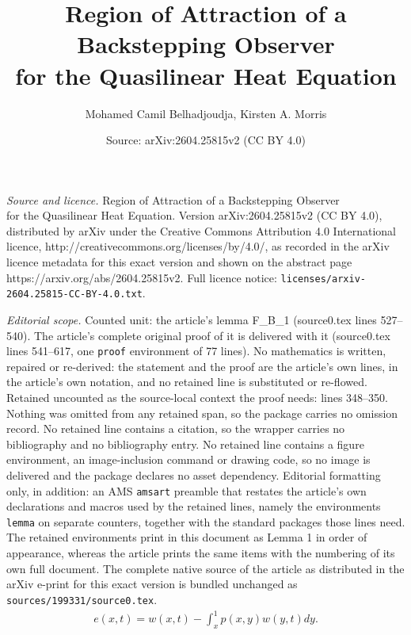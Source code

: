 \documentclass[10pt,a4paper]{amsart}
\title{Region of Attraction of a Backstepping Observer\\ for the Quasilinear Heat Equation}
\author{Mohamed Camil Belhadjoudja, Kirsten A. Morris}
\date{Source: arXiv:2604.25815v2 (CC BY 4.0)}
\begin{document}
\maketitle

\noindent\emph{Source and licence.} Region of Attraction of a Backstepping Observer\\ for the Quasilinear Heat Equation. Version arXiv:2604.25815v2 (CC BY 4.0), distributed by arXiv under the Creative Commons Attribution 4.0 International licence, http://creativecommons.org/licenses/by/4.0/, as recorded in the arXiv licence metadata for this exact version and shown on the abstract page https://arxiv.org/abs/2604.25815v2. Full licence notice: \texttt{licenses/arxiv-2604.25815-CC-BY-4.0.txt}.\par\smallskip

\noindent\textit{Editorial scope.} Counted unit: the article's lemma F\_B\_1 (source0.tex lines 527--540). The article's complete original proof of it is delivered with it (source0.tex lines 541--617, one \texttt{proof} environment of 77 lines). No mathematics is written, repaired or re-derived: the statement and the proof are the article's own lines, in the article's own notation, and no retained line is substituted or re-flowed.  Retained uncounted as the source-local context the proof needs: lines 348--350.  Nothing was omitted from any retained span, so the package carries no omission record.  No retained line contains a citation, so the wrapper carries no bibliography and no bibliography entry.  No retained line contains a figure environment, an image-inclusion command or drawing code, so no image is delivered and the package declares no asset dependency.  Editorial formatting only, in addition: an AMS \texttt{amsart} preamble that restates the article's own declarations and macros used by the retained lines, namely the environments \texttt{lemma} on separate counters, together with the standard packages those lines need.  The retained environments print in this document as Lemma 1 in order of appearance, whereas the article prints the same items with the numbering of its own full document.  The complete native source of the article as distributed in the arXiv e-print for this exact version is bundled unchanged as \texttt{sources/199331/source0.tex}.
\begin{align}
e(x,t) = w(x,t) - \int_x^1p(x,y)w(y,t)dy.\label{f_back}
\end{align}
\end{document}
